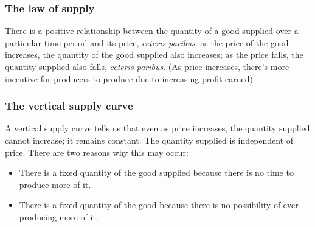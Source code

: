 \documentclass[a4paper,12pt]{article}
\begin{document}
\subsubsection*{The law of supply}
There is a positive relationship between the quantity of a good supplied over a particular time period and its price, \emph{ceteris paribus}: as the price of the good increases, the quantity of the good supplied also increases; as the price falls, the quantity supplied also falls, \emph{ceteris paribus}. (As price increases, there's more incentive for producers to produce due to increasing profit earned)
\subsubsection*{The vertical supply curve}
A vertical supply curve tells us that even as price increases, the quantity supplied cannot increase; it remains constant. The quantity supplied is independent of price. There are two reasons why this may occur:
\begin{itemize}
  \item There is a fixed quantity of the good supplied because there is no time to produce more of it.
  \item There is a fixed quantity of the good because there is no possibility of ever producing more of it. 
\end{itemize}
\end{document}
